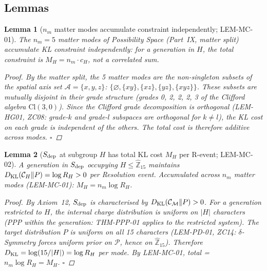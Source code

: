 \documentclass[12pt, a4paper]{article}
\newtheorem{lemma}{Lemma}[section]
\begin{document}
\subsection{Lemmas}
\label{zc16:sec:lemmas}

\begin{lemma}[$n_m$ matter modes accumulate constraint
  independently; LEM-MC-01]
\label{zc16:lem:independence}
The $n_m = 5$ matter modes of Possibility Space (Part~IX,
matter split) accumulate KL constraint independently: for
a generation in $H$, the total constraint is
$M_H = n_m \cdot c_H$, not a correlated sum.

\begin{proof}
By the matter split, the 5 matter modes are the non-singleton
subsets of the spatial axis set $\mathcal{A} = \{x,y,z\}$:
$\{\varnothing, \{xy\}, \{xz\}, \{yz\}, \{xyz\}\}$. These
subsets are mutually disjoint in their grade structure
(grades 0, 2, 2, 2, 3 of the Clifford algebra $\mathrm{Cl}(3,0)$).
Since the Clifford grade decomposition is orthogonal (LEM-HG01,
ZC08: grade-$k$ and grade-$l$ subspaces are orthogonal for
$k \neq l$), the KL cost on each grade is independent of
the others. The total cost is therefore additive across modes.
\hfill$\square$
\end{proof}
\end{lemma}

\begin{lemma}[$S_{\rm dep}$ at subgroup $H$ has total KL cost
  $M_H$ per R-event; LEM-MC-02]
\label{zc16:lem:sdep-cost}
A generation in $S_{\rm dep}$ occupying $H \leq
\widehat{\mathbb{Z}}_{15}$ maintains $D_{\rm KL}(\mathcal{C}_H
\| P) = \log R_H > 0$ per Resolution event.
Accumulated across $n_m$ matter modes (LEM-MC-01):
$M_H = n_m \log R_H$.

\begin{proof}
By Axiom~12, $S_{\rm dep}$ is characterised by
$D_{\rm KL}(\mathcal{C}_\mathcal{M} \| P) > 0$.
For a generation restricted to $H$, the internal charge
distribution is uniform on $|H|$ characters
(PPP within the generation: THM-PPP-01 applies to the
restricted system). The target distribution $P$ is uniform
on all 15 characters (LEM-PD-01, ZC14: $\delta$-Symmetry
forces uniform prior on $\mathcal{P}$, hence on
$\widehat{\mathbb{Z}}_{15}$).
Therefore $D_{\rm KL} = \log(15/|H|) = \log R_H$ per mode.
By LEM-MC-01, total = $n_m \log R_H = M_H$. \hfill$\square$
\end{proof}
\end{lemma}
\end{document}

